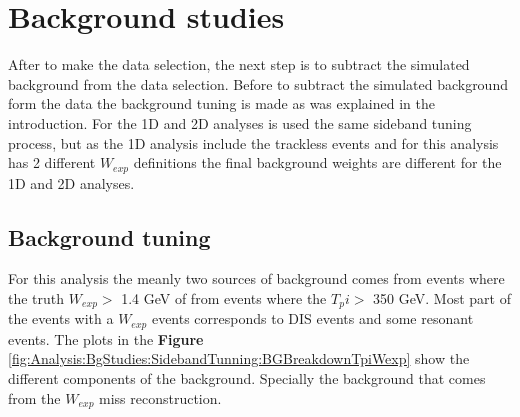 \pagebreak



\section{Background studies}
\label{Cap:Analysis:BgStudies}
After to make the data selection, the next step is to subtract the simulated background from the data selection. Before to subtract the simulated background form the data the background tuning is made as was explained in the introduction. For the 1D and 2D analyses is used the same sideband tuning process, but as the 1D analysis include the trackless events and for this analysis has 2 different $W_{exp}$ definitions the final background weights are different for the 1D and 2D analyses. 





\subsection{Background tuning}
\label{Cap:Analysis:BgStudies:SidebandTuning}
For this analysis the meanly two sources of background comes from events where the truth $W_{exp} >$ 1.4 GeV  of from events where the $T_pi > $ 350 GeV. Most part of the events with a $W_{exp}$ events corresponds to DIS events and some resonant events. The plots in the \textbf{Figure} \ref{fig:Analysis:BgStudies:SidebandTunning:BGBreakdownTpiWexp} show the different components of the background. Specially the background that comes from the $W_{exp}$ miss reconstruction. 

